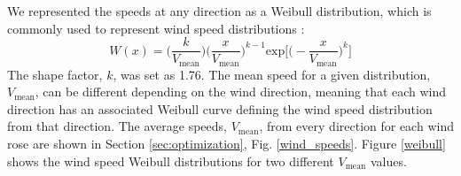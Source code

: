 \documentclass[wes, manuscript]{copernicus}
\begin{document}
We represented the speeds at any direction as a Weibull distribution, which is commonly used to represent wind speed distributions \citep{justus1978methods,rehman1994weibull,dorvlo2002estimating}: 
\begin{equation}
W(x) = \Big(\frac{k}{V_{\text{mean}}}\Big)\Big(\frac{x}{V_{\text{mean}}}\Big)^{k-1}\text{exp}\Big[\Big(-\frac{x}{V_{\text{mean}}}\Big)^k\Big]
\end{equation}
The shape factor, $k$, was set as 1.76. 
The mean speed for a given distribution, $V_{\text{mean}}$, can be different depending on the wind direction, meaning that each wind direction has an associated Weibull curve defining the wind speed distribution from that direction. The average speeds, $V_{\text{mean}}$, from every direction for each wind rose are shown in Section \ref{sec:optimization}, Fig. \ref{wind_speeds}.
Figure \ref{weibull} shows the wind speed Weibull distributions for two different $V_{\text{mean}}$ values. 

\end{document}
